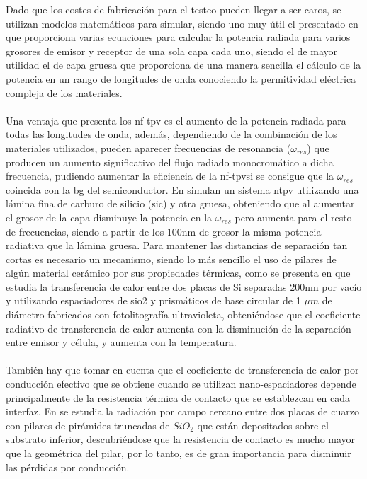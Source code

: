 Dado que los costes de fabricación para el testeo pueden llegar a ser caros, se utilizan modelos matemáticos para simular, siendo uno muy útil el presentado en \cite{nfTPV_equations} que proporciona varias ecuaciones para calcular la potencia radiada para varios grosores de emisor y receptor de una sola capa cada uno, siendo el de mayor utilidad el de capa gruesa que proporciona de una manera sencilla el cálculo de la potencia en un rango de longitudes de onda conociendo la permitividad eléctrica compleja de los materiales.\\\\
Una ventaja que presenta los \acrshort{nf-tpv} es el aumento de la potencia radiada para todas las longitudes de onda, además, dependiendo de la combinación de los materiales utilizados, pueden aparecer frecuencias de resonancia ($\omega_{res}$) que producen un aumento significativo del flujo radiado monocromático a dicha frecuencia, pudiendo aumentar la eficiencia de la \acrshort{nf-tpv}si se consigue que la $\omega_{res}$ coincida con la \acrshort{bg} del semiconductor. En \cite{doi:Near_field_ThinFilm} simulan un sistema \acrshort{ntpv} utilizando una lámina fina de carburo de silicio (\acrshort{sic}) y otra gruesa, obteniendo que al aumentar el grosor de la capa disminuye la potencia en la $\omega_{res}$ pero aumenta para el resto de frecuencias, siendo a partir de los 100nm de grosor la misma potencia radiativa que la lámina gruesa. Para mantener las distancias de separación tan cortas es necesario un mecanismo, siendo lo más sencillo el uso de pilares de algún material cerámico por sus propiedades térmicas, como se presenta en \cite{NearField200} que estudia la transferencia de calor entre dos placas de Si separadas 200nm por vacío y utilizando espaciadores de \acrshort{sio2} y prismáticos de base circular de 1 $\mu m$ de diámetro fabricados con fotolitografía ultravioleta, obteniéndose que el coeficiente radiativo de transferencia de calor aumenta con la disminución de la separación entre emisor y célula, y aumenta con la temperatura.\\\\
También hay que tomar en cuenta que el coeficiente de transferencia de calor por conducción efectivo que se obtiene cuando se utilizan nano-espaciadores depende principalmente de la resistencia térmica de contacto que se establezcan en cada interfaz. En \cite{nf_TPV_Pillars_SiO2} se estudia la radiación por campo cercano entre dos placas de cuarzo con pilares de pirámides truncadas de $SiO_2$ que están depositados sobre el substrato inferior, descubriéndose que la resistencia de contacto es mucho mayor que la geométrica del pilar, por lo tanto, es de gran importancia para disminuir las pérdidas por conducción.\\


